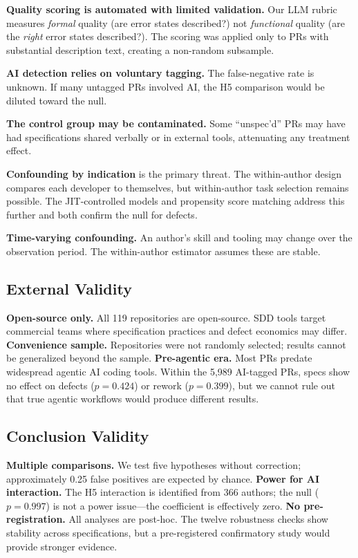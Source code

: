 \documentclass[a4paper,UKenglish,cleveref,autoref,thm-restate]{lipics-v2021}
\begin{document}
\textbf{Quality scoring is automated with limited validation.} Our LLM rubric measures \emph{formal} quality (are error states described?) not \emph{functional} quality (are the \emph{right} error states described?). The scoring was applied only to PRs with substantial description text, creating a non-random subsample.

\textbf{AI detection relies on voluntary tagging.} The false-negative rate is unknown. If many untagged PRs involved AI, the H5 comparison would be diluted toward the null.

\textbf{The control group may be contaminated.} Some ``unspec'd'' PRs may have had specifications shared verbally or in external tools, attenuating any treatment effect.

\textbf{Confounding by indication} is the primary threat. The within-author design compares each developer to themselves, but within-author task selection remains possible. The JIT-controlled models and propensity score matching address this further and both confirm the null for defects.

\textbf{Time-varying confounding.} An author's skill and tooling may change over the observation period. The within-author estimator assumes these are stable.

\subsection{External Validity}

\textbf{Open-source only.} All 119 repositories are open-source. SDD tools target commercial teams where specification practices and defect economics may differ. \textbf{Convenience sample.} Repositories were not randomly selected; results cannot be generalized beyond the sample. \textbf{Pre-agentic era.} Most PRs predate widespread agentic AI coding tools. Within the 5,989 AI-tagged PRs, specs show no effect on defects ($p = 0.424$) or rework ($p = 0.399$), but we cannot rule out that true agentic workflows would produce different results.

\subsection{Conclusion Validity}

\textbf{Multiple comparisons.} We test five hypotheses without correction; approximately 0.25 false positives are expected by chance. \textbf{Power for AI interaction.} The H5 interaction is identified from 366 authors; the null ($p = 0.997$) is not a power issue---the coefficient is effectively zero. \textbf{No pre-registration.} All analyses are post-hoc. The twelve robustness checks show stability across specifications, but a pre-registered confirmatory study would provide stronger evidence.
\end{document}

